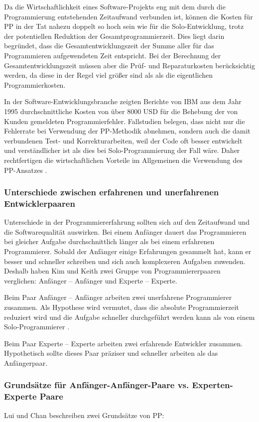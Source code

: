 Da die Wirtschaftlichkeit eines Software-Projekts eng mit dem durch die Programmierung entstehenden Zeitaufwand verbunden ist, können die Kosten für PP in der Tat nahezu doppelt so hoch sein wie für die Solo-Entwicklung, trotz der potentiellen Reduktion der Gesamtprogrammierzeit. Dies liegt darin begründet, dass die Gesamtentwicklungszeit der Summe aller für das Programmieren aufgewendeten Zeit  entspricht. Bei der Berechnung der Gesamtentwicklungszeit müssen aber die Prüf- und Reparaturkosten berücksichtig werden, da diese in der Regel viel größer sind als als die eigentlichen Programmierkosten.


In der Software-Entwicklungsbranche zeigten Berichte von IBM aus dem Jahr 1995 durchschnittliche Kosten von über 8000 USD für die Behebung der von Kunden gemeldeten Programmierfehler.  Fallstudien belegen, dass nicht nur die Fehlerrate bei Verwendung der PP-Methodik abnehmen, sondern auch die damit verbundenen Test- und Korrekturarbeiten, weil der Code oft besser entwickelt und verständlicher ist als dies bei Solo-Programmierung der Fall wäre. Daher rechtfertigen die wirtschaftlichen Vorteile im Allgemeinen die Verwendung des PP-Ansatzes \cite{Cockburn2001TheProgramming}.


\subsubsection*{Unterschiede zwischen erfahrenen und unerfahrenen Entwicklerpaaren} Unterschiede in der Programmiererfahrung sollten sich auf den Zeitaufwand und die Softwarequalität auswirken. Bei einem Anfänger dauert das Programmieren bei gleicher Aufgabe durchschnittlich länger als bei einem erfahrenen Programmierer. Sobald der Anfänger einige Erfahrungen gesammelt hat, kann er besser und schneller schreiben und sich auch komplexeren Aufgaben zuwenden. Deshalb haben Kim und Keith \cite{Lui2006PairExpertexpert} zwei Gruppe von Programmiererpaaren verglichen: Anfänger – Anfänger und Experte – Experte.

Beim Paar Anfänger – Anfänger arbeiten zwei unerfahrene Programmierer zusammen. Als Hypothese wird vermutet, dass die absolute Programmierzeit reduziert wird und die Aufgabe schneller durchgeführt werden kann als von einem Solo-Programmierer \cite{Lui2006PairExpertexpert}.

Beim Paar Experte – Experte arbeiten zwei erfahrende Entwickler zusammen. Hypothetisch sollte dieses Paar präziser und schneller arbeiten als das Anfängerpaar.


\subsubsection*{Grundsätze für Anfänger-Anfänger-Paare vs. Experten-Experte Paare} Lui und Chan \cite{Lui2006PairExpertexpert} beschreiben zwei Grundsätze von PP:

